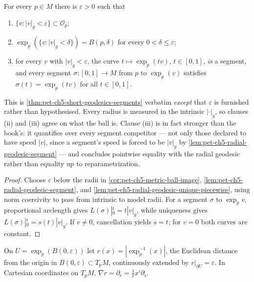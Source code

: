 \begin{lemma}
  \label{lem:pet-ch5-short-geodesics-segments-normal}
  \leanok
  For every $p\in M$ there is $\varepsilon>0$ such that
  \begin{enumerate}
    \item $\{v:|v|_g<\varepsilon\}\subset\mathcal O_p$;
    \item $\exp_p(\{v:|v|_g<\delta\})=B(p,\delta)$ for every $0<\delta\le\varepsilon$;
    \item for every $v$ with $|v|_g<\varepsilon$, the curve $t\mapsto\exp_p(tv)$,
      $t\in[0,1]$, \emph{is} a segment, and every segment $\sigma:[0,1]\to M$ from
      $p$ to $\exp_p(v)$ satisfies $\sigma(t)=\exp_p(tv)$ for all $t\in[0,1]$.
  \end{enumerate}
  This is \cref{thm:pet-ch5-short-geodesics-segments} verbatim \emph{except} that
  $\varepsilon$ is furnished rather than hypothesised.  Every radius is measured in
  the intrinsic $|\cdot|_g$, so clauses (ii) and (iii) agree on what the ball is.
  Clause (iii) is in fact stronger than the book's: it quantifies over every
  segment competitor — not only those declared to have speed $|v|$, since a
  segment's speed is forced to be $|v|_g$ by
  \cref{lem:pet-ch5-radial-geodesic-segment} — and concludes pointwise equality
  with the radial geodesic rather than equality up to reparametrization.
\end{lemma}
\begin{proof}
  \leanok
  \sketch
  Choose $\varepsilon$ below the radii in
  \cref{cor:pet-ch5-metric-ball-image},
  \cref{lem:pet-ch5-radial-geodesic-segment}, and
  \cref{lem:pet-ch5-radial-geodesic-unique-piecewise}, using norm coercivity to
  pass from intrinsic to model radii.  For a segment $\sigma$ to $\exp_pv$,
  proportional arclength gives $L(\sigma)|_0^t=t|v|_g$, while uniqueness gives
  $L(\sigma)|_0^t=s(t)|v|_g$.  If $v\ne0$, cancellation yields $s=t$; for $v=0$
  both curves are constant.
\end{proof}

\begin{definition}
  \label{def:pet-ch5-radial-distance-function}
  \leanok
  On $U=\exp_p(B(0,\varepsilon))$ let $r(x)=|\exp_p^{-1}(x)|$, the Euclidean
  distance from the origin in $B(0,\varepsilon)\subset T_pM$, continuously extended
  by $r|_{\partial U}=\varepsilon$. In Cartesian coordinates on $T_pM$,
  $\nabla r=\partial_r=\tfrac1rx^i\partial_i$.
\end{definition}

